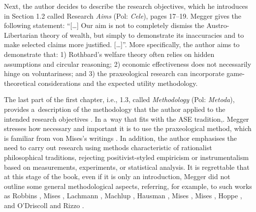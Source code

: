 Next, the author decides to describe the research objectives, which he introduces in Section 1.2 called Research \textit{Aims} (Pol: \textit{Cele}), pages 17–19. Megger gives the following statement: ``[…] Our aim is not to completely dismiss the Austro-Libertarian theory of wealth, but simply to demonstrate its inaccuracies and to make selected claims more justified. […]''. More specifically, the author aims to demonstrate that: 1) Rothbard's welfare theory often relies on hidden assumptions and circular reasoning; 2) economic effectiveness does not necessarily hinge on voluntariness; and 3) the praxeological research can incorporate game-theoretical considerations and the expected utility methodology.



The last part of the first chapter, i.e., 1.3, called \textit{Methodology} (Pol: \textit{Metoda}), provides a~description of the methodology that the author applied to the intended research objectives 
\parencite[][pp.19–24]{megger_sprawiedliwosc_2021}. %
 In a~way that fits with the ASE tradition,. Megger stresses how necessary and important it is to use the praxeological method, which is familiar from von Mises's writings 
\parencites*[][]{}[][]{}. %
 In addition, the author emphasises the need to carry out research using methods characteristic of rationalist philosophical traditions, rejecting positivist-styled empiricism or instrumentalism based on measurements, experiments, or statistical analysis. It is regrettable that at this stage of the book, even if it is only an introduction, Megger did not outline some general methodological aspects, referring, for example, to such works as Robbins 
\parencite*[][]{robbins_essay_1932}, %
 Mises 
\parencite*[][]{mises_ultimate_1962}, %
 Lachmann 
\parencite*[][]{lachmann_legacy_1971}, %
 Machlup 
\parencite*[][]{machlup_methodology_1978}, %
 Hausman 
\parencite*[][]{hausman_impossibility_1995}, %
 Mises 
\parencite*[][]{}, %
 Mises 
\parencite*[][]{mises_human_1998}, %
 Hoppe 
\parencite*[][]{}, %
 and O'Driscoll and Rizzo 
\parencite*[][]{odriscoll_austrian_2014}.%





